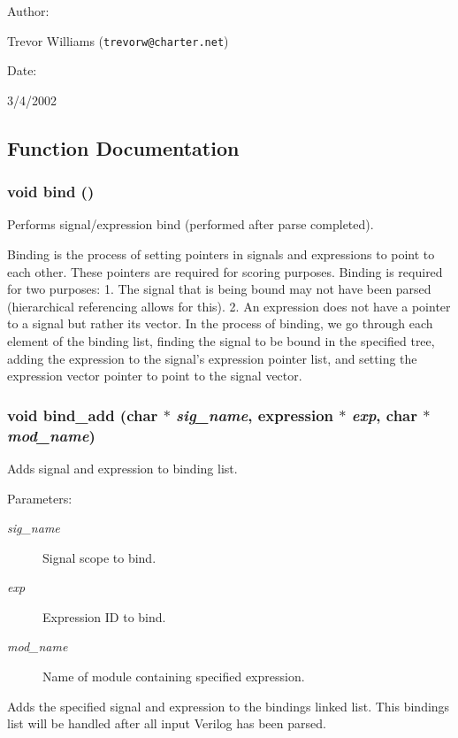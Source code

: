 \begin{Desc}
\item[Author: ]\par
Trevor Williams ({\tt trevorw@charter.net}) \end{Desc}
\begin{Desc}
\item[Date: ]\par
3/4/2002\end{Desc}


\subsection{Function Documentation}
\subsubsection{\setlength{\rightskip}{0pt plus 5cm}void bind ()}\label{binding_8h_a3}


Performs signal/expression bind (performed after parse completed).

Binding is the process of setting pointers in signals and expressions to point to each other. These pointers are required for scoring purposes. Binding is required for two purposes: 1. The signal that is being bound may not have been parsed (hierarchical referencing allows for this). 2. An expression does not have a pointer to a signal but rather its vector. In the process of binding, we go through each element of the binding list, finding the signal to be bound in the specified tree, adding the expression to the signal's expression pointer list, and setting the expression vector pointer to point to the signal vector. 
\subsubsection{\setlength{\rightskip}{0pt plus 5cm}void bind\_\-add (char $\ast$ {\em sig\_\-name}, {\bf expression} $\ast$ {\em exp}, char $\ast$ {\em mod\_\-name})}\label{binding_8h_a0}


Adds signal and expression to binding list.

\begin{Desc}
\item[Parameters: ]\par
\begin{description}
\item[{\em 
sig\_\-name}]Signal scope to bind. \item[{\em 
exp}]Expression ID to bind. \item[{\em 
mod\_\-name}]Name of module containing specified expression.\end{description}
\end{Desc}
Adds the specified signal and expression to the bindings linked list. This bindings list will be handled after all input Verilog has been parsed. 
